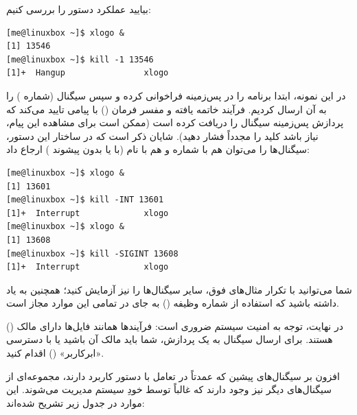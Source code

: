 بیایید عملکرد دستور  را بررسی کنیم:

\begin{latin}
\begin{lstlisting}
[me@linuxbox ~]$ xlogo &
[1] 13546
[me@linuxbox ~]$ kill -1 13546
[1]+  Hangup                xlogo
\end{lstlisting}
\end{latin}

در این نمونه، ابتدا برنامه  را در پس‌زمینه فراخوانی کرده و سپس سیگنال  (شماره ) را به آن ارسال کردیم. فرآیند  خاتمه یافته و مفسر فرمان () با پیامی تایید می‌کند که پردازش پس‌زمینه سیگنال  را دریافت کرده است (ممکن است برای مشاهده این پیام، نیاز باشد کلید  را مجدداً فشار دهید). شایان ذکر است که در ساختار این دستور، سیگنال‌ها را می‌توان هم با شماره و هم با نام (با یا بدون پیشوند ) ارجاع داد:

\begin{latin}
\begin{lstlisting}
[me@linuxbox ~]$ xlogo &
[1] 13601
[me@linuxbox ~]$ kill -INT 13601
[1]+  Interrupt             xlogo
[me@linuxbox ~]$ xlogo &
[1] 13608
[me@linuxbox ~]$ kill -SIGINT 13608
[1]+  Interrupt             xlogo
\end{lstlisting}
\end{latin}

شما می‌توانید با تکرار مثال‌های فوق، سایر سیگنال‌ها را نیز آزمایش کنید؛ همچنین به یاد داشته باشید که استفاده از شماره وظیفه () به جای  در تمامی این موارد مجاز است.

در نهایت، توجه به امنیت سیستم ضروری است: فرآیندها همانند فایل‌ها دارای مالک () هستند. برای ارسال سیگنال به یک پردازش، شما باید مالک آن باشید یا با دسترسی «ابرکاربر» () اقدام کنید.

افزون بر سیگنال‌های پیشین که عمدتاً در تعامل با دستور  کاربرد دارند، مجموعه‌ای از سیگنال‌های دیگر نیز وجود دارند که غالباً توسط خودِ سیستم مدیریت می‌شوند. این موارد در جدول زیر تشریح شده‌اند:

